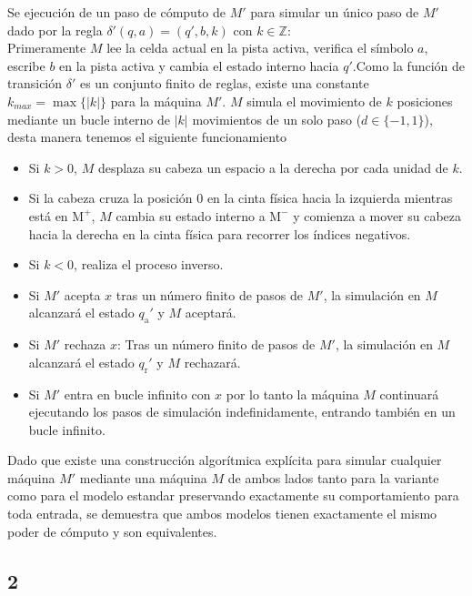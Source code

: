 Se ejecución de un paso de cómputo de $M'$ para simular un único paso de $M'$ dado por la regla $\delta'(q, a) = (q', b, k)$ con $k \in \mathbb{Z}$:\\


Primeramente $M$ lee la celda actual en la pista activa, verifica el símbolo $a$, escribe $b$ en la pista activa y cambia el estado interno hacia $q'$.Como la función de transición $\delta'$ es un conjunto finito de reglas, existe una constante $k_{max} = \max \{ \vert{}k\vert{} \}$ para la máquina $M'$. $M$ simula el movimiento de $k$ posiciones mediante un bucle interno de $\vert{}k\vert{}$ movimientos de un solo paso ($d \in \{-1, 1\}$), desta manera tenemos el siguiente funcionamiento\\

\begin{itemize}
    \item Si $k > 0$, $M$ desplaza su cabeza un espacio a la derecha por cada unidad de $k$.
    \item Si la cabeza cruza la posición $0$ en la cinta física hacia la izquierda mientras está en $\text{M}^+$, $M$ cambia su estado interno a $\text{M}^-$ y comienza a mover su cabeza hacia la derecha en la cinta física para recorrer los índices negativos.
    \item Si $k < 0$, realiza el proceso inverso.
    \item Si $M'$ acepta $x$ tras un número finito de pasos de $M'$, la simulación en $M$ alcanzará el estado $q_{\text{a}}'$ y $M$ aceptará.
    \item Si $M'$ rechaza $x$: Tras un número finito de pasos de $M'$, la simulación en $M$ alcanzará el estado $q_{\text{r}}'$ y $M$ rechazará.
    \item Si $M'$ entra en bucle infinito con $x$ por lo tanto la máquina $M$ continuará ejecutando los pasos de simulación indefinidamente, entrando también en un bucle infinito.
\end{itemize}

Dado que existe una construcción algorítmica explícita para simular cualquier máquina $M'$ mediante una máquina $M$ de ambos lados tanto para la variante como para el modelo estandar preservando exactamente su comportamiento para toda entrada, se demuestra que ambos modelos tienen exactamente el mismo poder de cómputo y son equivalentes.


\subsection*{2}

